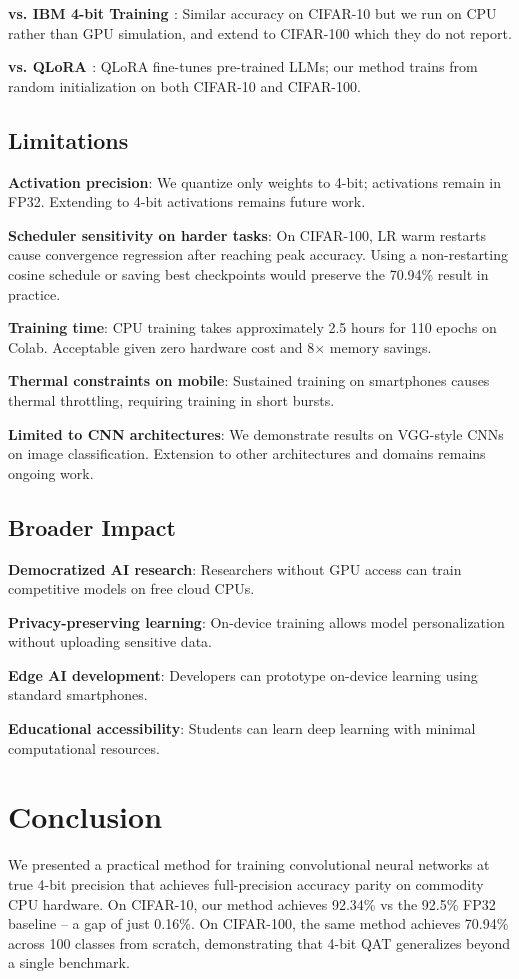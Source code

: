 \documentclass[conference]{IEEEtran}
\begin{document}
\textbf{vs. IBM 4-bit Training \cite{sun2020ultra}}: Similar accuracy on CIFAR-10 but we run on CPU rather than GPU simulation, and extend to CIFAR-100 which they do not report.

\textbf{vs. QLoRA \cite{dettmers2023qlora}}: QLoRA fine-tunes pre-trained LLMs; our method trains from random initialization on both CIFAR-10 and CIFAR-100.

\subsection{Limitations}
\textbf{Activation precision}: We quantize only weights to 4-bit; activations remain in FP32. Extending to 4-bit activations remains future work.

\textbf{Scheduler sensitivity on harder tasks}: On CIFAR-100, LR warm restarts cause convergence regression after reaching peak accuracy. Using a non-restarting cosine schedule or saving best checkpoints would preserve the 70.94\% result in practice.

\textbf{Training time}: CPU training takes approximately 2.5 hours for 110 epochs on Colab. Acceptable given zero hardware cost and 8$\times$ memory savings.

\textbf{Thermal constraints on mobile}: Sustained training on smartphones causes thermal throttling, requiring training in short bursts.

\textbf{Limited to CNN architectures}: We demonstrate results on VGG-style CNNs on image classification. Extension to other architectures and domains remains ongoing work.

\subsection{Broader Impact}
\textbf{Democratized AI research}: Researchers without GPU access can train competitive models on free cloud CPUs.

\textbf{Privacy-preserving learning}: On-device training allows model personalization without uploading sensitive data.

\textbf{Edge AI development}: Developers can prototype on-device learning using standard smartphones.

\textbf{Educational accessibility}: Students can learn deep learning with minimal computational resources.

\section{Conclusion}
We presented a practical method for training convolutional neural networks at true 4-bit precision that achieves full-precision accuracy parity on commodity CPU hardware. On CIFAR-10, our method achieves 92.34\% vs the 92.5\% FP32 baseline -- a gap of just 0.16\%. On CIFAR-100, the same method achieves 70.94\% across 100 classes from scratch, demonstrating that 4-bit QAT generalizes beyond a single benchmark.
\end{document}
